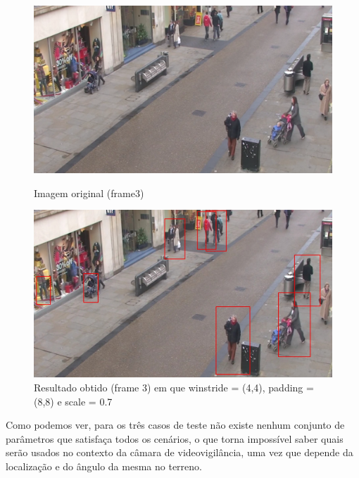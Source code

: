 \begin{figure}[h]
	\centering
	\begin{minipage}[b]{0.49\textwidth}
		\centering
		\includegraphics[width=\textwidth]{img/vision/exemplos/frame3.png}
		\caption[Imagem original (frame3)]{Imagem original (frame3) \newline \newline}
		\label{bluetth05-res}
	\end{minipage}
	\hfill
	\begin{minipage}[b]{0.49\textwidth}
		\centering
		\includegraphics[width=\textwidth]{img/vision/exemplos/result_frame3.jpg}
		\caption[Resultado obtido (frame 3)]{Resultado obtido (frame 3) em que winstride = (4,4), padding = (8,8) e scale = 0.7}
		\label{comimageesqu1ema}
	\end{minipage}
\end{figure}



Como podemos ver, para os três casos de teste não existe nenhum conjunto de parâmetros que satisfaça todos os cenários, o que torna impossível saber quais serão usados no contexto da câmara de videovigilância, uma vez que depende da localização e do ângulo da mesma no terreno. 

